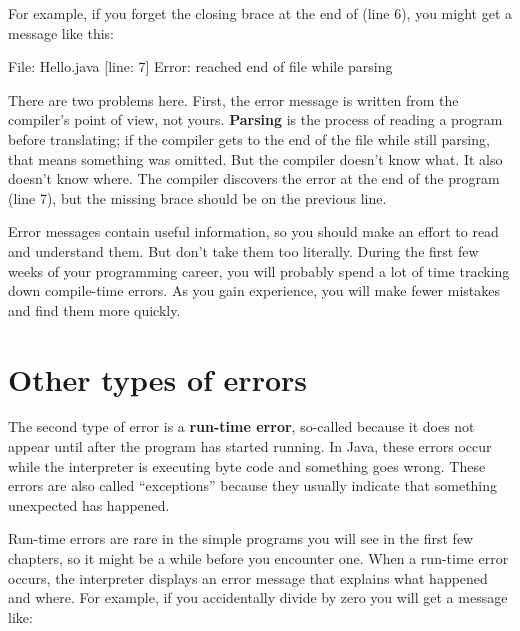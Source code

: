 For example, if you forget the closing brace at the end of  (line 6), you might get a message like this:

\begin{stdout}
File: Hello.java  [line: 7]
Error: reached end of file while parsing
\end{stdout}


There are two problems here.
First, the error message is written from the compiler's point of view, not yours.
{\bf Parsing} is the process of reading a program before translating; if the compiler gets to the end of the file while still parsing, that means something was omitted.
But the compiler doesn't know what.
It also doesn't know where.
The compiler discovers the error at the end of the program (line 7), but the missing brace should be on the previous line.

Error messages contain useful information, so you should make an effort to read and understand them.
But don't take them too literally.
During the first few weeks of your programming career, you will probably spend a lot of time tracking down compile-time errors.
As you gain experience, you will make fewer mistakes and find them more quickly.


\section{Other types of errors}


The second type of error is a {\bf run-time error}, so-called because it does not appear until after the program has started running.
In Java, these errors occur while the interpreter is executing byte code and something goes wrong.
These errors are also called ``exceptions'' because they usually indicate that something unexpected has happened.

Run-time errors are rare in the simple programs you will see in the first few chapters, so it might be a while before you encounter one.
When a run-time error occurs, the interpreter displays an error message that explains what happened and where.
For example, if you accidentally divide by zero you will get a message like:

